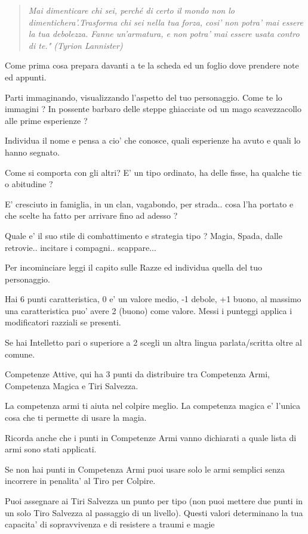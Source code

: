 \documentclass[a4paper,11pt,twoside,openany]{book}
\begin{document}
\label{costruiamo-il-personaggio}
\begin{quote}\textit{
Mai dimenticare chi sei, perché di certo il mondo non lo dimentichera'.Trasforma chi sei nella tua forza, cosi' non potra' mai essere la tua debolezza. Fanne un'armatura, e non potra' mai essere usata contro di te." (Tyrion Lannister)
}\end{quote}
	
Come prima cosa prepara davanti a te la scheda ed un foglio dove prendere note ed appunti.

Parti immaginando, visualizzando l'aspetto del tuo personaggio. Come te lo immagini ? In possente barbaro delle steppe ghiacciate od un mago scavezzacollo alle prime esperienze ?

Individua il nome e pensa a cio' che conosce, quali esperienze ha avuto e quali lo hanno segnato.

Come si comporta con gli altri? E' un tipo ordinato, ha delle fisse, ha qualche tic o abitudine ?

E' cresciuto in famiglia, in un clan, vagabondo, per strada.. cosa l'ha portato e che scelte ha fatto per arrivare fino ad adesso ?

Quale e' il suo stile di combattimento e strategia tipo ? Magia, Spada, dalle retrovie.. incitare i compagni.. scappare...

Per incominciare leggi il capito sulle Razze ed individua quella del tuo personaggio.

Hai 6 punti caratteristica, 0 e' un valore medio, -1 debole, +1 buono, al massimo una caratteristica puo' avere 2 (buono) come valore. Messi i punteggi applica i modificatori razziali se presenti.

Se hai Intelletto pari o superiore a 2 scegli un altra lingua parlata/scritta oltre al comune.

Competenze Attive, qui ha 3 punti da distribuire tra Competenza Armi, Competenza Magica e Tiri Salvezza.

La competenza armi ti aiuta nel colpire meglio. La competenza magica e' l'unica cosa che ti permette di usare la magia.

Ricorda anche che i punti in Competenze Armi vanno dichiarati a quale lista di armi sono stati applicati.

Se non hai punti in Competenza Armi puoi usare solo le armi semplici senza incorrere in penalita' al Tiro per Colpire.

Puoi assegnare ai Tiri Salvezza un punto per tipo (non puoi mettere due punti in un solo Tiro Salvezza al passaggio di un livello). Questi valori determinano la tua capacita' di sopravvivenza e di resistere a traumi e magie
\end{document}
